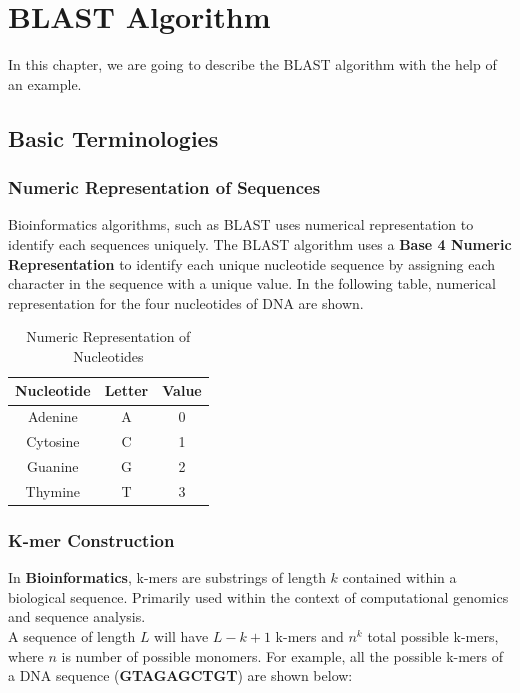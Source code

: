 \documentclass[12pt, a4paper]{report}
\begin{document}
\chapter{BLAST Algorithm}
In this chapter, we are going to describe the BLAST algorithm with the help of an example. 

\section{Basic Terminologies}
\subsection{Numeric Representation of Sequences}

Bioinformatics algorithms, such as BLAST uses numerical representation to identify each sequences uniquely. The BLAST algorithm uses a \textbf{Base 4 Numeric Representation} to identify each unique nucleotide sequence by assigning each character in the sequence with a unique value. In the following table, numerical representation for the four nucleotides of DNA are shown.

\begin{table}[H]
    \centering
    \begin{tabular}{|c|c|c|}
        \hline
        Nucleotide  & Letter & Value \\\hline
        Adenine     & A      & 0     \\\hline
        Cytosine    & C      & 1     \\\hline
        Guanine     & G      & 2     \\\hline
        Thymine     & T      & 3     \\\hline
    \end{tabular}
    \caption{Numeric Representation of Nucleotides}
\end{table}

\subsection{K-mer Construction}
In \textbf{Bioinformatics}, k-mers are substrings of length $k$ contained within a biological sequence. Primarily used within the context of computational genomics and sequence analysis. \\

A sequence of length $L$ will have $L-k+1$ k-mers and $n^k$ total possible k-mers, where $n$ is number of possible monomers. For example, all the possible k-mers of a DNA sequence (\textbf{GTAGAGCTGT}) are shown below:
\end{document}
